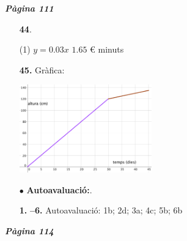 \documentclass[a4paper, pdf, twoside]{book}
\begin{document}
\begin{multicols}{2}
{\textbf{\em Pàgina 111}} \hrulefill
\begin{enumerate}
\vspace{0.25cm}



 \item[\fontfamily{phv}\selectfont\color{blue}\textbf{44}. ] 
 \begin{tasks}[column-sep=1em, item-indent=1.3333em](1)
	 \task $y=0.03 x$
	 \task $1.65$ \euro {}
	  minuts
\end{tasks}
 \end{enumerate}
\begin{enumerate}
\vspace{0.25cm}
\item[\fontfamily{phv}\selectfont\color{blue}\textbf{45. }] 
Gràfica: \par \includegraphics [width=0.45\textwidth ]{img-sol/t8-45}
\vspace{0.25cm}
 \item[$\bullet$ ] {\selectfont\color{blue}\textbf{Autoavaluació:}. }

\vspace{0.25cm}
\item[\fontfamily{phv}\selectfont\color{blue}\textbf{1. }]  \scalebox{0.6}{\simbolclau } 
\textbf {--6.} Autoavaluació: 1b; 2d; 3a; 4c; 5b; 6b
 \end{enumerate}
\vfill\null
\columnbreak
\def\currentname{Solucions del Tema 9}
\vspace*{0.75cm}

 

\vspace*{0.4cm}
 {}
\vspace{0.3cm}


{\textbf{\em Pàgina 114}} \hrulefill
\begin{enumerate}
\vspace{0.25cm}



\end{enumerate}
\end{multicols}
\end{document}
